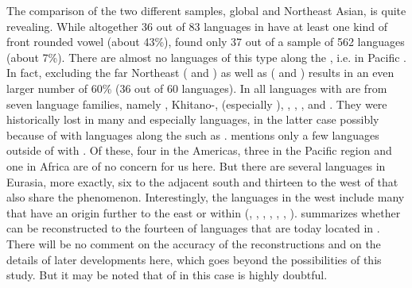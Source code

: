 The comparison of the two different samples, global and Northeast Asian, is quite revealing. While altogether 36 out of 83 languages in  have at least one kind of front rounded vowel (about 43\%), \citet{Maddieson2013} found only 37 out of a sample of 562 languages (about 7\%). There are almost no languages of this type along the , i.e. in Pacific . In fact, excluding the far Northeast ( and ) as well as  ( and ) results in an even larger number of 60\% (36 out of 60 languages). In  all languages with  are from seven language families, namely , Khitano-,  (especially ), , , , and . They were historically lost in many  and especially  languages, in the latter case possibly because of  with languages along the  such as . \citet{Maddieson2013} mentions only a few languages outside of  with . Of these, four in the Americas, three in the Pacific region and one in Africa are of no concern for us here. But there are several languages in Eurasia, more exactly, six to the adjacent south and thirteen to the west of  that also share the phenomenon. Interestingly, the languages in the west include many that have an origin further to the east or within  (, , , , , , ).  summarizes whether  can be reconstructed to the fourteen  of languages that are today located in . There will be no comment on the accuracy of the reconstructions and on the details of later developments here, which goes beyond the possibilities of this study. But it may be noted that   of  in this case is highly doubtful.

